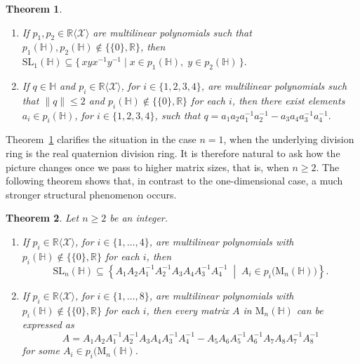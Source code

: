 \documentclass[11pt]{article}
\newtheorem{theorem}{Theorem}
\theoremstyle{definition}
\begin{document}
{{{{				\begin{theorem}\label{qq}
					\
					\begin{enumerate}[\rm (i)]
						\item If $p_1, p_2 \in \mathbb{R}\langle \mathcal{X} \rangle$ are multilinear polynomials such that $p_1(\mathbb{H}), p_2(\mathbb{H}) \notin \{\{0\}, \mathbb{R}\}$, then
						$\mathrm{SL}_1(\mathbb{H})
						\subseteq
						\{\, xyx^{-1}y^{-1} \mid x \in p_1(\mathbb{H}),\; y \in p_2(\mathbb{H}) \,\}.$
						\item If $q \in \mathbb{H}$ and  $p_i \in \mathbb{R}\langle \mathcal{X} \rangle$, for $i \in \{1,2,3,4\}$, are multilinear polynomials such that $\|q\| \le 2$ and $p_i(\mathbb{H}) \notin \{\{0\}, \mathbb{R}\}$ for each $i$, then there exist elements $a_i \in p_i(\mathbb{H})$, for $i \in \{1,2,3,4\}$, such that
						$q
						=
						a_1 a_2 a_1^{-1} a_2^{-1}
						-
						a_3 a_4 a_3^{-1} a_4^{-1}.$
					\end{enumerate}
				\end{theorem}
				
				Theorem~\ref{qq} clarifies the situation in the case $n = 1$, when the underlying division ring is the real quaternion division ring. It is therefore natural to ask how the picture changes once we pass to higher matrix sizes, that is, when $n \geq 2$. The following theorem shows that, in contrast to the one-dimensional case, a much stronger structural phenomenon occurs.
				
				\begin{theorem}\label{real}
					Let $n \geq 2$ be an integer.
					\begin{enumerate}[\rm (i)]
						\item If $p_i \in \mathbb{R}\langle \mathcal{X} \rangle$, for $i \in \{1,\dots,4\}$, are multilinear polynomials with $p_i(\mathbb{H}) \notin \{\{0\}, \mathbb{R}\}$ for each $i$, then
						$$\mathrm{SL}_n(\mathbb{H}) \subseteq
						\left\{
						A_1A_2A_1^{-1}A_2^{-1}
						A_3A_4A_3^{-1}A_4^{-1}
						\;\middle|\;
						A_i \in p_i\big(\mathrm{M}_n(\mathbb{H})\big)
						\right\}.$$
						\item If $p_i \in \mathbb{R}\langle \mathcal{X} \rangle$, for $i \in \{1,\dots,8\}$, are multilinear polynomials with $p_i(\mathbb{H}) \notin \{\{0\}, \mathbb{R}\}$ for each $i$, then every matrix $A$ in $	\mathrm{M}_n(\mathbb{H})$ can be expressed as $$A=A_1A_2A_1^{-1}A_2^{-1}
						A_3A_4A_3^{-1}A_4^{-1}
						-
						A_5A_6A_5^{-1}A_6^{-1}
						A_7A_8A_7^{-1}A_8^{-1}$$ for some $A_i \in p_i\big(\mathrm{M}_n(\mathbb{H})$.
					\end{enumerate}
				\end{theorem}
				
}}}}
\end{document}
